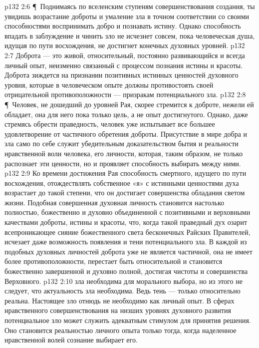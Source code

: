 \vs p132 2:6 \P\ Поднимаясь по вселенским ступеням совершенствования создания, ты увидишь возрастание доброты и умаление зла в точном соответствии со своими способностями воспринимать добро и познавать истину. Однако способность впадать в заблуждение и чинить зло не исчезнет совсем, пока человеческая душа, идущая по пути восхождения, не достигнет конечных духовных уровней.
\vs p132 2:7 Доброта --- это живой, относительный, постоянно развивающийся и всегда личный опыт, неизменно связанный с процессом познания истины и красоты. Доброта зиждется на признании позитивных истинных ценностей духовного уровня, которые в человеческом опыте должны противостоять своей отрицательной противоположности --- призракам потенциального зла.
\vs p132 2:8 \P\ Человек, не дошедший до уровней Рая, скорее стремится к доброте, нежели ей обладает, она для него пока только цель, а не опыт достигнутого. Однако, даже стремясь обрести праведность, человек уже испытывает все большее удовлетворение от частичного обретения доброты. Присутствие в мире добра и зла само по себе служит убедительным доказательством бытия и реальности нравственной воли человека, его личности, которая, таким образом, не только распознает эти ценности, но и проявляет способность выбирать между ними.
\vs p132 2:9 Ко времени достижения Рая способность смертного, идущего по пути восхождения, отождествлять собственное «я» с истинными ценностями духа возрастает до такой степени, что он достигает совершенства обладания светом жизни. Подобная совершенная духовная личность становится настолько полностью, божественно и духовно объединенной с позитивными и верховными качествами доброты, истины и красоты, что, когда такой праведный дух озарит всепроникающее сияние божественного света бесконечных Райских Правителей, исчезает даже возможность появления и тени потенциального зла. В каждой из подобных духовных личностей доброта уже не является частичной, она не имеет более противоположности, перестает быть относительной и становится божественно завершенной и духовно полной, достигая чистоты и совершенства Верховного.
\vs p132 2:10  зла необходима для морального выбора, но из этого не следует, что актуальность зла необходима. Ведь тень --- только относительно реальна. Настоящее зло отнюдь не необходимо как личный опыт. В сферах нравственного совершенствования на низших уровнях духовного развития потенциальное зло может служить адекватным стимулом для принятия решения. Оно становится реальностью личного опыта только тогда, когда наделенное нравственной волей сознание выбирает его.
